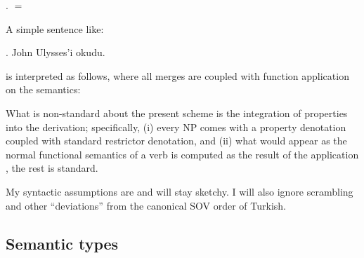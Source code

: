 \documentclass[11pt,a4paper]{article}
\begin{document}
\ex.  $=$ 

A simple sentence like:

\ex. John Ulysses'i okudu.

is interpreted as follows, where all merges are coupled with function application on the semantics:



What is non-standard about the present scheme is the integration of properties into the derivation; specifically, (i) every NP comes with a property denotation coupled with standard restrictor denotation, and (ii) what would appear as the normal functional semantics of a verb is computed as the result of the application , the rest is standard.

My syntactic assumptions are and will stay sketchy. I will also ignore scrambling and other ``deviations'' from the canonical SOV order of Turkish.


\subsection{Semantic types}
\end{document}
